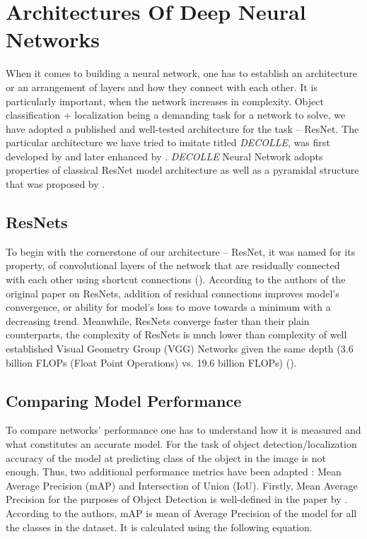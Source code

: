 
\section{Architectures Of Deep Neural Networks}


When it comes to building a neural network, one has to establish an
architecture or an arrangement of layers and how they connect with each other.
It is particularly important, when the network increases in complexity. Object
classification + localization being a demanding task for a network to solve,
we have adopted a published and well-tested architecture for the task --
ResNet. The particular architecture we have tried to imitate titled 
\textit{DECOLLE}, was first developed by  and later
enhanced by . \textit{DECOLLE} Neural Network adopts 
properties of classical ResNet model architecture as well as a pyramidal structure that
was proposed by . 


\subsection{ResNets}



To begin with the cornerstone of our architecture -- ResNet, it was named for its property,
of convolutional layers of the network that are residually connected with each other using
shortcut connections ().
According to the authors of the original paper on ResNets,
addition of residual connections improves model's convergence, or ability for
model's loss to move towards a minimum with a decreasing trend. Meanwhile,
ResNets converge faster than their plain counterparts, the complexity of 
ResNets is much lower than complexity of well established Visual Geometry
Group (VGG) Networks given the same depth (3.6 billion FLOPs (Float Point 
Operations) vs. 19.6 billion FLOPs) (). 

\subsection{Comparing Model Performance}
To compare networks' performance one has to understand how it is measured and what
constitutes an accurate model. For the task of object detection/localization accuracy
of the model at predicting class of the object in the image is not enough. Thus,
two additional performance metrics have been adapted : Mean Average Precision (mAP) and
Intersection of Union (IoU). Firstly, Mean Average Precision for the purposes of Object
Detection is well-defined in the paper by . According to the authors,
mAP is mean of Average Precision of the model for all the classes in the dataset. It is
calculated using the following equation.


